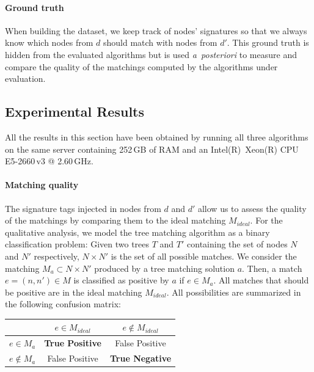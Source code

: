 \paragraph{Ground truth}
When building the dataset, we keep track of nodes' signatures so that we always know which nodes from $d$ should match with nodes from $d'$.
This ground truth is hidden from the evaluated algorithms but is used \emph{a~posteriori} to measure and compare the quality of the matchings computed by the algorithms under evaluation.

\subsection{Experimental Results}\label{sftm:sec:performances}
All the results in this section have been obtained by running all three algorithms on the same server containing 252\,GB of RAM and an Intel(R)~Xeon(R) CPU E5-2660\,v3 @ 2.60\,GHz.

\paragraph{Matching quality}
The signature tags injected in nodes from $d$ and $d'$ allow us to assess the quality of the matchings by comparing them to the ideal matching $M_{ideal}$.
For the qualitative analysis, we model the tree matching algorithm as a binary classification problem: Given two trees $T$ and $T'$ containing the set of nodes $N$ and $N'$ respectively, $N \times N'$ is the set of all possible matches.
We consider the matching $M_a \subset N \times N'$ produced by a tree matching solution $a$.
Then, a match $e=(n,n') \in M$ is classified as positive by $a$ if $e \in M_a$.
All matches that should be positive are in the ideal matching $M_{ideal}$.
All possibilities are summarized in the following confusion matrix:
\begin{center}
    \begin{tabular}[h]{l|c|c|}
    \cline{2-3} 
    
                                          & $e \in M_{ideal}$ & $e \notin M_{ideal}$ \\
    \hline
    \multicolumn{1}{|l|}{$e \in M_a$}    & \textbf{True Positive} & False Positive\\
    \hline
    \multicolumn{1}{|l|}{$e \notin M_a$} &         False Positive & \textbf{True Negative}\\
    \hline
    \end{tabular}
\end{center}

